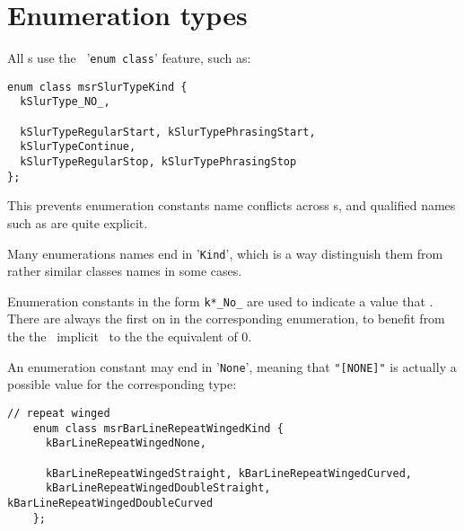 \section{Enumeration types}

All \enumType s use the \CPlusplus\ '{\tt enum class}' feature, such as:

\begin{lstlisting}[language=CPlusPlus]
enum class msrSlurTypeKind {
  kSlurType_NO_,

  kSlurTypeRegularStart, kSlurTypePhrasingStart,
  kSlurTypeContinue,
  kSlurTypeRegularStop, kSlurTypePhrasingStop
};
\end{lstlisting}

This prevents enumeration constants name conflicts across \enumType s, and qualified names such as  are quite explicit.

Many enumerations names end in '{\tt Kind}', which is a way distinguish them from rather similar classes names in some cases.

Enumeration constants in the form {\tt k*_No_} are used to indicate a value that . There are always the first on in the corresponding enumeration, to benefit from the the \CPlusplus\ implicit \initialization\  to the the equivalent of 0.

An enumeration constant may end in '{\tt None}', meaning that {\tt "[NONE]"} is actually a possible value for the corresponding type:
\begin{lstlisting}[language=CPlusPlus]
    // repeat winged
    enum class msrBarLineRepeatWingedKind {
      kBarLineRepeatWingedNone,

      kBarLineRepeatWingedStraight, kBarLineRepeatWingedCurved,
      kBarLineRepeatWingedDoubleStraight, kBarLineRepeatWingedDoubleCurved
    };
\end{lstlisting}

